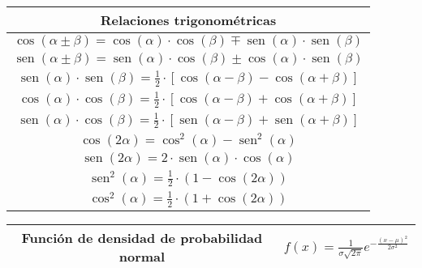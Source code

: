 \documentclass[es]{article}
\DeclareMathOperator{\sen}{sen}
\begin{document}
\renewcommand{\arraystretch}{1}

\begin{center}

    \renewcommand{\arraystretch}{1.6}
    \begin{tabular}{|c|}
        \multicolumn{1}{c}{{\bf Relaciones trigonométricas}}\\
        \hline 
        $\cos (\alpha \pm \beta) = \cos (\alpha) \cdot \cos (\beta) \mp \sen (\alpha) \cdot \sen (\beta)$ \\
        \hline 
        $\sen (\alpha \pm \beta) = \sen (\alpha) \cdot \cos (\beta) \pm \cos(\alpha) \cdot \sen (\beta)$ \\
        \hline 
        $\sen (\alpha) \cdot \sen (\beta) = \frac{1}{2} \cdot \left [ \cos (\alpha - \beta ) - \cos (\alpha + \beta ) \right ]$ \\ 
        \hline 
        $\cos (\alpha) \cdot \cos (\beta) = \frac{1}{2} \cdot \left [ \cos (\alpha - \beta ) + \cos (\alpha + \beta ) \right ]$ \\
        \hline 
        $\sen (\alpha) \cdot \cos (\beta) = \frac{1}{2} \cdot \left [ \sen (\alpha - \beta ) + \sen (\alpha + \beta ) \right ]$ \\ 
        \hline 
        $\cos (2 \alpha) = \cos^2 (\alpha) - \sen^2 (\alpha)$ \\ 
        \hline 
        $\sen (2 \alpha) = 2 \cdot \sen (\alpha) \cdot \cos (\alpha)$ \\
        \hline 
        $\sen^2 (\alpha) = \frac{1}{2} \cdot \left ( 1 - \cos (2 \alpha) \right )$ \\
        \hline 
        $\cos^2 (\alpha) = \frac{1}{2} \cdot \left ( 1 + \cos (2 \alpha) \right )$ \\
        \hline
    \end{tabular}
    \renewcommand{\arraystretch}{1}
    \vspace{0.5cm}

    \renewcommand{\arraystretch}{2}
        \begin{tabular}{|c|c|}
            \hline 
            Función de densidad de probabilidad normal & $f(x) = \displaystyle\frac{1}{\sigma \sqrt{2 \pi}} e^{- \displaystyle\frac{(x - \mu)^2}{2 \sigma^2}}$ \\
            \hline
        \end{tabular}
    \renewcommand{\arraystretch}{1}


\end{center}
\end{document}
